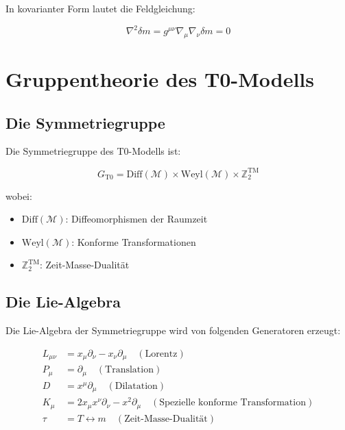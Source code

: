 \documentclass[12pt,a4paper]{report}
\begin{document}
	In kovarianter Form lautet die Feldgleichung:
	
	\begin{equation}
		\nabla^2 \delta m = g^{\mu\nu} \nabla_\mu \nabla_\nu \delta m = 0
	\end{equation}
	
	\section{Gruppentheorie des T0-Modells}
	
	\subsection{Die Symmetriegruppe}
	
	Die Symmetriegruppe des T0-Modells ist:
	
	\begin{equation}
		G_{\text{T0}} = \text{Diff}(\mathcal{M}) \times \text{Weyl}(\mathcal{M}) \times \mathbb{Z}_2^{\text{TM}}
	\end{equation}
	
	wobei:
	\begin{itemize}
		\item $\text{Diff}(\mathcal{M})$: Diffeomorphismen der Raumzeit
		\item $\text{Weyl}(\mathcal{M})$: Konforme Transformationen
		\item $\mathbb{Z}_2^{\text{TM}}$: Zeit-Masse-Dualität
	\end{itemize}
	
	\subsection{Die Lie-Algebra}
	
	Die Lie-Algebra der Symmetriegruppe wird von folgenden Generatoren erzeugt:
	
	\begin{align}
		L_{\mu\nu} &= x_\mu \partial_\nu - x_\nu \partial_\mu \quad (\text{Lorentz}) \\
		P_\mu &= \partial_\mu \quad (\text{Translation}) \\
		D &= x^\mu \partial_\mu \quad (\text{Dilatation}) \\
		K_\mu &= 2x_\mu x^\nu \partial_\nu - x^2 \partial_\mu \quad (\text{Spezielle konforme Transformation}) \\
		\tau &= T \leftrightarrow m \quad (\text{Zeit-Masse-Dualität})
	\end{align}
	
\end{document}
